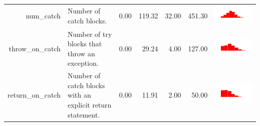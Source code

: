 \begin{table}[ht]
\begin{tabular}{rp{16em}rrrrc}
  num\_catch & Number of catch blocks. & 0.00 & 119.32 & 32.00 & 451.30 & \includegraphics[scale = 0.1, clip = true, trim= 50px 60px 50px 60px]{hist-afc847f0b6862e86823253de78fc0d16.pdf} \\ 
  throw\_on\_catch & Number of try blocks that throw an exception. & 0.00 & 29.24 & 4.00 & 127.00 & \includegraphics[scale = 0.1, clip = true, trim= 50px 60px 50px 60px]{hist-98dd667c113add4bb8ccce60ef1cb8d7.pdf} \\ 
  return\_on\_catch & Number of catch blocks with an explicit return statement. & 0.00 & 11.91 & 2.00 & 50.00 & \includegraphics[scale = 0.1, clip = true, trim= 50px 60px 50px 60px]{hist-f9a7775b7b8e5425ef21fcd168e80196.pdf} \\ 

\end{tabular}
\end{table}
